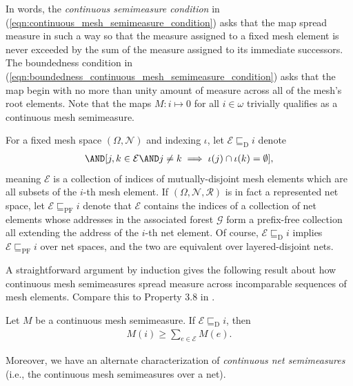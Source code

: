 In words, the \textit{continuous semimeasure condition} in (\ref{eqn:continuous_mesh_semimeasure_condition}) asks that the map spread measure in such a way so that the measure assigned to a fixed mesh element is never exceeded by the sum of the measure assigned to its immediate successors. The boundedness condition in (\ref{eqn:boundedness_continuous_mesh_semimeasure_condition}) asks that the map begin with no more than unity amount of measure across all of the mesh's root elements. Note that the maps $M : i \mapsto 0$ for all $i \in \omega$ trivially qualifies as a continuous mesh semimeasure.

For a fixed mesh space $(\Omega, \mathcal{N})$ and indexing $\iota$, let $\mathcal{E} \sqsubseteq_{\operatorname{D}} i$ denote 
\begin{align*}
    [j \in \mathcal{E} \implies \iota(j) \subseteq \iota(i)] \AND [j, k \in \mathcal{E} \AND j \neq k \implies \iota(j) \cap \iota(k) = \emptyset],
\end{align*}
meaning $\mathcal{E}$ is a collection of indices of mutually-disjoint mesh elements which are all subsets of the $i$-th mesh element. If $(\Omega, \mathcal{N}, \mathscr{R})$ is in fact a represented net space, let $\mathcal{E} \sqsubseteq_{\operatorname{PF}} i$ denote that $\mathcal{E}$ contains the indices of a collection of net elements whose addresses in the associated forest $\mathcal{G}$ form a prefix-free collection all extending the address of the $i$-th net element. Of course, $\mathcal{E} \sqsubseteq_{\operatorname{D}} i$ implies $\mathcal{E} \sqsubseteq_{\operatorname{PF}} i$ over net spaces, and the two are equivalent over layered-disjoint nets.

A straightforward argument by induction gives the following result about how continuous mesh semimeasures spread measure across incomparable sequences of mesh elements. Compare this to Property 3.8 in \cite{May14}.

\begin{proposition}
    \label{prop:generalized_Kraft_inequality}
    Let $M$ be a continuous mesh semimeasure. If $\mathcal{E} \sqsubseteq_{\operatorname{D}} i$, then 
    \begin{align*}
        M(i) \geq \sum_{e \in \mathcal{E}} M(e).
    \end{align*}
\end{proposition}

Moreover, we have an alternate characterization of \textit{continuous net semimeasures} (i.e., the continuous mesh semimeasures over a net).

